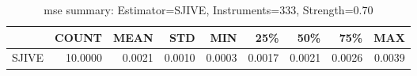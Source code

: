 \begin{table}[ht]
\centering
\caption{mse summary: Estimator=SJIVE, Instruments=333, Strength=0.70}
\begin{tabular}{lrrrrrrrr}
\toprule
 & COUNT & MEAN & STD & MIN & 25\% & 50\% & 75\% & MAX \\
\midrule
SJIVE & 10.0000 & 0.0021 & 0.0010 & 0.0003 & 0.0017 & 0.0021 & 0.0026 & 0.0039 \\
\bottomrule
\end{tabular}
\end{table}
